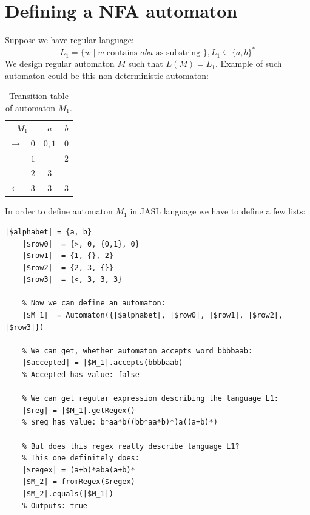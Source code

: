 \documentclass{ctuthesis}
\begin{document}
\section{Defining a NFA automaton}
\label{sec:example_NFA}
Suppose we have regular language: 
\begin{equation*}
L_1 = \{w \mid w \text{ contains } aba \text{ as substring }\}, L_1 \subseteq \{a, b\}^*
\end{equation*} 
We design regular automaton $M$ such that $L(M) = L_1$. Example of such automaton could be this non-deterministic automaton:
\begin{table}[H]
\begin{ctucolortab}
\begin{tabular}{cc|cc}
\multicolumn{2}{c}{\bfseries $M_1$} & \bfseries $a$ & \bfseries $b$ \\\Midrule
$\rightarrow$ 	& $0$ & $0,1$ 	& $0$  \\
				& $1$ &  	& $2$  \\
				& $2$ & $3$		&  \\
$\leftarrow$	& $3$ & $3$		& $3$ 
\end{tabular}
\end{ctucolortab}
\caption{Transition table of automaton $M_1$.}
\label{fig:examples_NFA_table}
\end{table} 

In order to define automaton $M_1$ in JASL language we have to define a few lists: 

\begin{minipage}{\linewidth}
\begin{lstlisting}[language = JASL]
	|$alphabet| = {a, b}
	|$row0|  = {>, 0, {0,1}, 0}
	|$row1|  = {1, {}, 2}
	|$row2|  = {2, 3, {}}
	|$row3|  = {<, 3, 3, 3}
    
	% Now we can define an automaton:
	|$M_1|  = Automaton({|$alphabet|, |$row0|, |$row1|, |$row2|, |$row3|})

	% We can get, whether automaton accepts word bbbbaab:
	|$accepted| = |$M_1|.accepts(bbbbaab)   
	% Accepted has value: false 
	
	% We can get regular expression describing the language L1:
	|$reg| = |$M_1|.getRegex()
	% $reg has value: b*aa*b((bb*aa*b)*)a((a+b)*) 

	% But does this regex really describe language L1? 
	% This one definitely does:
	|$regex| = (a+b)*aba(a+b)*
	|$M_2| = fromRegex($regex)
	|$M_2|.equals(|$M_1|) 	
	% Outputs: true
\end{lstlisting}
\end{minipage}
\end{document}
